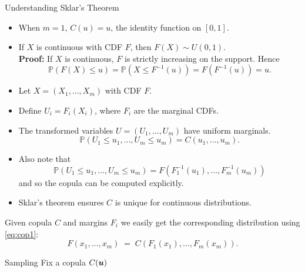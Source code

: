 \documentclass[11pt,handout,aspectratio=169]{beamer}
\begin{document}
\begin{frame}{Understanding Sklar's Theorem}
\begin{itemize}
    \item When $m = 1$, $C(u) = u$, the identity function on $[0, 1]$.\\[5mm]
    \item If $X$ is continuous with CDF $F$, then $F(X) \sim U(0, 1)$. \\[3mm]
    \textbf{Proof:} If $X$ is continuous, $F$ is strictly increasing on the support. Hence
    \[
    \mathbb{P}(F(X) \leq u) = \mathbb{P}(X \leq F^{-1}(u)) = F(F^{-1}(u)) = u.
    \]
\end{itemize}
\end{frame}

\begin{frame}{}
\begin{itemize}
    \item Let $X = (X_1, \ldots, X_m)$ with CDF $F$.
    \item Define $U_i = F_i(X_i)$, where $F_i$ are the marginal CDFs.
    \item The transformed variables $U = (U_1, \ldots, U_m)$ have uniform marginals.
    \[ \mathbb{P}(U_1 \leq u_1, \ldots, U_m \leq u_m) = C(u_1, \ldots, u_m). \]
    \item Also note that 
\begin{equation}\label{eq:cop1}
    \mathbb{P}(U_1 \leq u_1, \ldots, U_m \leq u_m) = F(F_1^{-1}(u_1),\ldots,F_m^{-1}(u_m))	
\end{equation}
    and so the copula can be computed explicitly.
    \item Sklar's theorem ensures $C$ is unique for continuous distributions.
\end{itemize}
\begin{alertblock}{}
	Given copula $C$ and margins $F_i$ we easily get the corresponding  distribution using \eqref{eq:cop1}:
	$$
	F(x_1,\ldots,x_m)\;=\;C(F_1(x_1),\ldots,F_m(x_m)).
	$$
\end{alertblock}
\end{frame}

\begin{frame}{Sampling}
	Fix a copula $C(\boldsymbol u)$
\end{frame}
\end{document}
